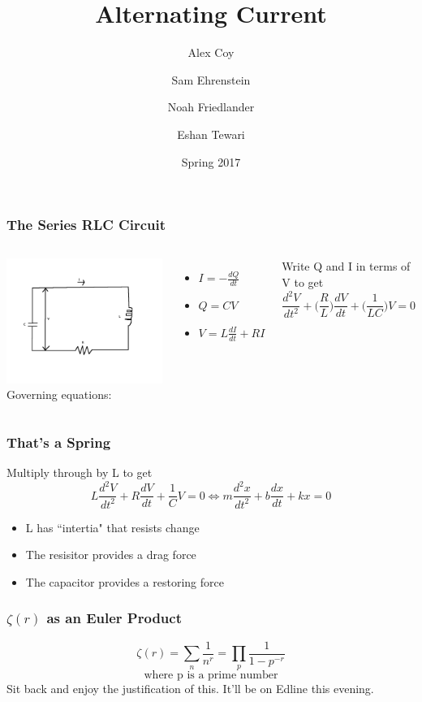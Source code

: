 \documentclass{beamer}
\title{Alternating Current}
\date{Spring 2017}
\author{Alex Coy \and Sam Ehrenstein \and Noah Friedlander \and Eshan Tewari}
\numberwithin{equation}{section}
\begin{document}
\maketitle

\begin{frame}
\frametitle{The Series RLC Circuit}
\begin{columns}
\includegraphics[width=\textwidth]{series_rlc}
Governing equations:
\begin{itemize}
\item
$I=-\frac{dQ}{dt}$
\item
$Q=CV$
\item
$V=L\frac{dI}{dt}+RI$
\end{itemize}

Write Q and I in terms of V to get
\[\frac{d^2V}{dt^2}+\bigg(\frac{R}{L}\bigg)\frac{dV}{dt}+\bigg(\frac{1}{LC}\bigg)V=0\]
\end{columns}
\end{frame}


\begin{frame}
\frametitle{That's a Spring}
Multiply through by L to get
\[L\frac{d^2V}{dt^2}+R\frac{dV}{dt}+\frac{1}{C}V=0 \iff m\frac{d^2x}{dt^2} + b\frac{dx}{dt}+kx=0\]

\begin{itemize}
\item
L has ``intertia" that resists change
\item
The resisitor provides a drag force
\item
The capacitor provides a restoring force
\end{itemize}
\end{frame}

\begin{frame}
\frametitle{$\zeta(r)$ as an Euler Product}
\[\zeta(r) = \sum_{n} \frac{1}{n^r}=\prod_p \frac{1}{1-p^{-r}}\]
\[\text{where p is a prime number}\]
Sit back and enjoy the justification of this. It'll be on Edline this evening.
\end{frame}
\end{document}
